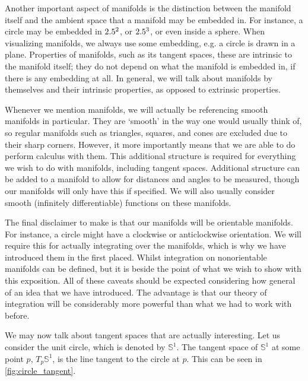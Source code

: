 \documentclass[a4paper,12pt]{article}
\begin{document}
Another important aspect of manifolds is the distinction between the manifold itself and the ambient space that a manifold may be embedded in.
For instance, a circle may be embedded in $2.5^2$, or $2.5^3$, or even inside a sphere.
When visualizing manifolds, we always use some embedding, e.g. a circle is drawn in a plane.
Properties of manifolds, such as its tangent spaces, these are intrinsic to the manifold itself; they do not depend on what the manifold is embedded in, if there is any embedding at all.
In general, we will talk about manifolds by themselves and their intrinsic properties, as opposed to extrinsic properties.

Whenever we mention manifolds, we will actually be referencing smooth manifolds in particular.
They are `smooth' in the way one would usually think of, so regular manifolds such as triangles, squares, and cones are excluded due to their sharp corners.
However, it more importantly means that we are able to do perform calculus with them.
This additional structure is required for everything we wish to do with manifolds, including tangent spaces.
Additional structure can be added to a manifold to allow for distances and angles to be measured, though our manifolds will only have this if specified.
We will also usually consider smooth (infinitely differentiable) functions on these manifolds.

The final disclaimer to make is that our manifolds will be orientable manifolds.
For instance, a circle might have a clockwise or anticlockwise orientation.
We will require this for actually integrating over the manifolds, which is why we have introduced them in the first placed.
Whilst integration on nonorientable manifolds can be defined, but it is beside the point of what we wish to show with this exposition.
All of these caveats should be expected considering how general of an idea that we have introduced.
The advantage is that our theory of integration will be considerably more powerful than what we had to work with before.

We may now talk about tangent spaces that are actually interesting.
Let us consider the unit circle, which is denoted by $\mathbb{S}^1$.
The tangent space of $\mathbb{S}^1$ at some point $p$, $T_p \mathbb{S}^1$, is the line tangent to the circle at $p$.
This can be seen in \cref{fig:circle_tangent}.
\end{document}
